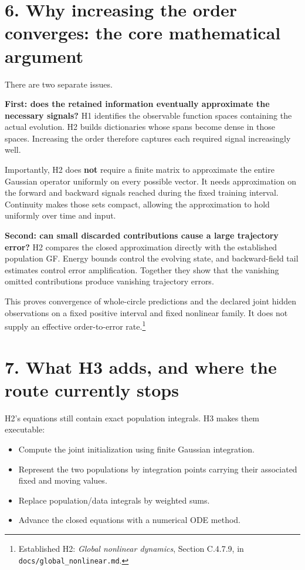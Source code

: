 \documentclass[11pt,a4paper]{scrartcl}
\begin{document}
\section{6. Why increasing the order converges: the core mathematical argument}

There are two separate issues.

\textbf{First: does the retained information eventually approximate the necessary signals?} H1 identifies the observable function spaces containing the actual evolution. H2 builds dictionaries whose spans become dense in those spaces. Increasing the order therefore captures each required signal increasingly well.

Importantly, H2 does \textbf{not} require a finite matrix to approximate the entire Gaussian operator uniformly on every possible vector. It needs approximation on the forward and backward signals reached during the fixed training interval. Continuity makes those sets compact, allowing the approximation to hold uniformly over time and input.

\textbf{Second: can small discarded contributions cause a large trajectory error?} H2 compares the closed approximation directly with the established population GF. Energy bounds control the evolving state, and backward-field tail estimates control error amplification. Together they show that the vanishing omitted contributions produce vanishing trajectory errors.

This proves convergence of whole-circle predictions and the declared joint hidden observations on a fixed positive interval and fixed nonlinear family. It does not supply an effective order-to-error rate.\footnote{Established H2: \textit{Global nonlinear dynamics}, Section C.4.7.9, in \texttt{docs/global\_nonlinear.md}.}

\section{7. What H3 adds, and where the route currently stops}

H2’s equations still contain exact population integrals. H3 makes them executable:
\begin{itemize}
\item Compute the joint initialization using finite Gaussian integration.
\item Represent the two populations by integration points carrying their associated fixed and moving values.
\item Replace population/data integrals by weighted sums.
\item Advance the closed equations with a numerical ODE method.
\end{itemize}
\end{document}
